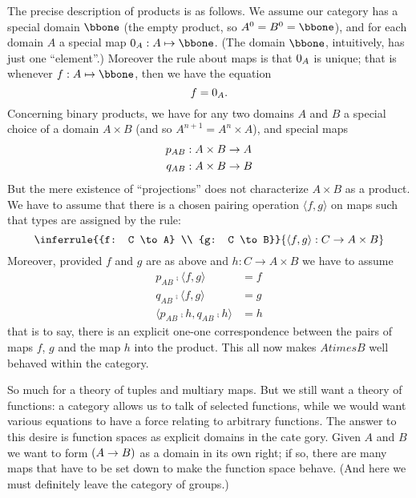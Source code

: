 The precise description of products is as follows. We as­sume our category has a special domain $\bbone$ (the empty product, so $A^0 = B^0 = {\bbone}$), and for each domain $A$ a special map $\zeromap_A: A \mapsto \bbone$. (The domain $\bbone$, intuitively, has just one ``element''.)  Moreover the rule about maps is that $0_A$ is unique; that is whenever $f : A \mapsto \bbone$, then we have the equation
$$f = 0_A .$$
%
Concerning binary products, we have for any two domains $A$ and $B$ a special choice of a domain $A \times B$ (and so $A^{n+1} = A^n \times A$), and special maps
\begin{align*}
p_{AB}&: A \times B \rightarrow A\\
q_{AB}&: A \times B \rightarrow B
\end{align*}
%
But the mere existence of ``projections'' does not characterize $A \times B$ as a product. We have to assume that there is a chosen pairing operation $\langle f,g \rangle$ on maps such that types are assigned by the rule:
%
$$
\inferrule
  {{f: C \to A} \\ {g: C \to B}}
  {\langle f,g \rangle: C \to A \times B}
$$
%
Moreover, provided $f$ and $g$ are as above and $h: C \to A \times B $ we have to assume
\begin{align*}
p_{AB} \comp \langle f,g \rangle &= f\\
q_{AB} \comp \langle f,g \rangle &= g\\
\langle p_{AB}\comp h, q_{AB}\comp h\rangle &= h
\end{align*}
%
that is to say, there is an explicit one-one correspondence between the pairs of maps $f$, $g$ and the map $h$ into the product. This all now makes $A times B$ well behaved within the category.

So much for a theory of tuples and multiary maps. But we still want a theory of functions: a category allows us to talk of selected functions, while we would want various equations to have a force relating to arbitrary functions. The answer to this desire is function spaces as explicit domains in the cate­ gory. Given $A$ and $B$ we want to form $(A \rightarrow B)$ as a domain in its own right; if so, there are many maps that have to be set down to make the function space behave. (And here we must defi­nitely leave the category of groups.)

